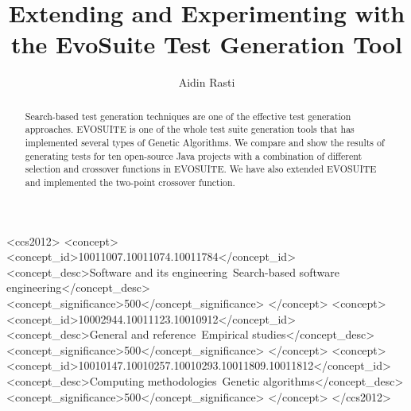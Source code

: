 \documentclass[sigconf]{acmart}
\begin{document}
\title{Extending and Experimenting with the EvoSuite Test Generation Tool}

\author{Aidin Rasti}

\renewcommand{\shortauthors}{Aidin}

\begin{abstract}
  Search-based test generation techniques are one of the effective test generation approaches. 
  EVOSUITE is one of the whole test suite generation tools that has implemented several 
  types of Genetic Algorithms. We compare and show the results of generating tests for ten open-source 
  Java projects with a combination of different selection and crossover functions in EVOSUITE. 
  We have also extended EVOSUITE and implemented the two-point crossover function.
\end{abstract}


\begin{CCSXML}
<ccs2012>
   <concept>
       <concept_id>10011007.10011074.10011784</concept_id>
       <concept_desc>Software and its engineering~Search-based software engineering</concept_desc>
       <concept_significance>500</concept_significance>
       </concept>
   <concept>
       <concept_id>10002944.10011123.10010912</concept_id>
       <concept_desc>General and reference~Empirical studies</concept_desc>
       <concept_significance>500</concept_significance>
       </concept>
   <concept>
       <concept_id>10010147.10010257.10010293.10011809.10011812</concept_id>
       <concept_desc>Computing methodologies~Genetic algorithms</concept_desc>
       <concept_significance>500</concept_significance>
       </concept>
 </ccs2012>
\end{CCSXML}
\end{document}
